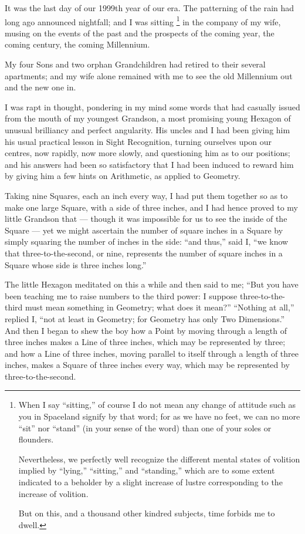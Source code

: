 \documentclass[12pt, a4paper, oneside]{memoir}
\begin{document}
It was the last day of our 1999th year of our era. The patterning of the rain
had long ago announced nightfall; and I was sitting \footnote{ When I say
``sitting,'' of course I do not mean any change of attitude such as you in
Spaceland signify by that word; for as we have no feet, we can no more ``sit''
nor ``stand'' (in your sense of the word) than one of your soles or flounders.

Nevertheless, we perfectly well recognize the different mental states of
volition implied by ``lying,'' ``sitting,'' and ``standing,'' which are to some
extent indicated to a beholder by a slight increase of lustre corresponding to
the increase of volition.

But on this, and a thousand other kindred subjects, time forbids me to dwell.}
in the company of my wife, musing on the events of the past and the prospects
of the coming year, the coming century, the coming Millennium.

My four Sons and two orphan Grandchildren had retired to their several
apartments; and my wife alone remained with me to see the old Millennium out
and the new one in.

I was rapt in thought, pondering in my mind some words that had casually
issued from the mouth of my youngest Grandson, a most promising young Hexagon
of unusual brilliancy and perfect angularity. His uncles and I had been giving
him his usual practical lesson in Sight Recognition, turning ourselves upon
our centres, now rapidly, now more slowly, and questioning him as to our
positions; and his answers had been so satisfactory that I had been induced to
reward him by giving him a few hints on Arithmetic, as applied to Geometry.

Taking nine Squares, each an inch every way, I had put them together so as to
make one large Square, with a side of three inches, and I had hence proved to
my little Grandson that --- though it was impossible for us to see the inside of
the Square --- yet we might ascertain the number of square inches in a Square by
simply squaring the number of inches in the side: ``and thus,'' said I, ``we know
that three-to-the-second, or nine, represents the number of square inches in a
Square whose side is three inches long.''

The little Hexagon meditated on this a while and then said to me; ``But you
have been teaching me to raise numbers to the third power: I suppose
three-to-the-third must mean something in Geometry; what does it mean?''
``Nothing at all,'' replied I, ``not at least in Geometry; for Geometry has only
Two Dimensions.'' And then I began to shew the boy how a Point by moving
through a length of three inches makes a Line of three inches, which may be
represented by three; and how a Line of three inches, moving parallel to
itself through a length of three inches, makes a Square of three inches every
way, which may be represented by three-to-the-second.
\end{document}
